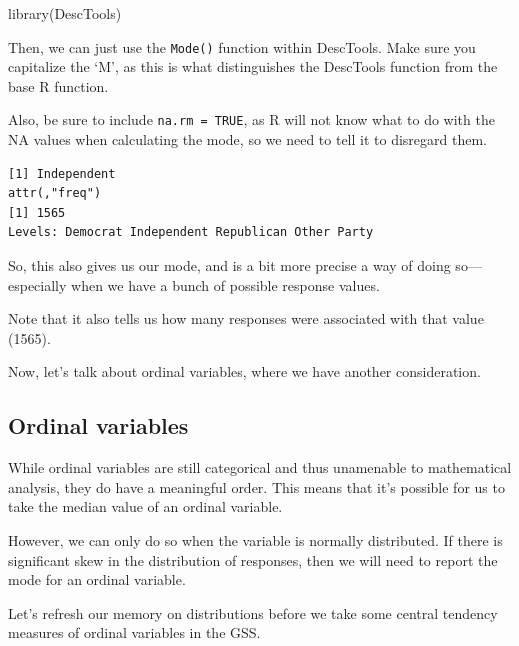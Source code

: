 \documentclass[
  letterpaper,
  DIV=11,
  numbers=noendperiod]{scrreprt}
\newenvironment{Shaded}{\begin{snugshade}}{\end{snugshade}}
\newcommand{\AttributeTok}[1]{\textcolor[rgb]{0.40,0.45,0.13}{#1}}
\newcommand{\ConstantTok}[1]{\textcolor[rgb]{0.56,0.35,0.01}{#1}}
\newcommand{\FunctionTok}[1]{\textcolor[rgb]{0.28,0.35,0.67}{#1}}
\newcommand{\NormalTok}[1]{\textcolor[rgb]{0.00,0.23,0.31}{#1}}
\newcommand{\SpecialCharTok}[1]{\textcolor[rgb]{0.37,0.37,0.37}{#1}}
\begin{document}
\begin{Shaded}
\begin{Highlighting}[]
\FunctionTok{library}\NormalTok{(DescTools)}
\end{Highlighting}
\end{Shaded}

Then, we can just use the \texttt{Mode()} function within DescTools.
Make sure you capitalize the `M', as this is what distinguishes the
DescTools function from the base R function.

Also, be sure to include \texttt{na.rm\ =\ TRUE}, as R will not know
what to do with the NA values when calculating the mode, so we need to
tell it to disregard them.

\begin{Shaded}
\end{Shaded}

\begin{verbatim}
[1] Independent
attr(,"freq")
[1] 1565
Levels: Democrat Independent Republican Other Party
\end{verbatim}

So, this also gives us our mode, and is a bit more precise a way of
doing so---especially when we have a bunch of possible response values.

Note that it also tells us how many responses were associated with that
value (1565).

Now, let's talk about ordinal variables, where we have another
consideration.

\subsection{Ordinal variables}\label{ordinal-variables}

While ordinal variables are still categorical and thus unamenable to
mathematical analysis, they do have a meaningful order. This means that
it's possible for us to take the median value of an ordinal variable.

However, we can only do so when the variable is normally distributed. If
there is significant skew in the distribution of responses, then we will
need to report the mode for an ordinal variable.

Let's refresh our memory on distributions before we take some central
tendency measures of ordinal variables in the GSS.
\end{document}
